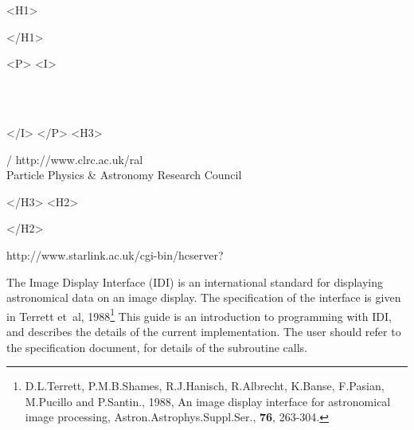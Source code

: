 \begin{htmlonly}
   \xlabel{}
   \begin{rawhtml} <H1> \end{rawhtml}
      \stardoctitle
   \begin{rawhtml} </H1> \end{rawhtml}


   \begin{rawhtml} <P> <I> \end{rawhtml}
   \stardoccategory\ \stardocnumber \\
   \stardocauthors \\
   \stardocdate
   \begin{rawhtml} </I> </P> <H3> \end{rawhtml}
       /
                        {http://www.clrc.ac.uk/ral} \\
      Particle Physics \& Astronomy Research Council \\
   \begin{rawhtml} </H3> <H2> \end{rawhtml}
   \begin{rawhtml} </H2> \end{rawhtml}
      {http://www.starlink.ac.uk/cgi-bin/hcserver?\stardocsource}\\


\end{htmlonly}


The Image Display Interface (IDI) is an international standard for
displaying astronomical data on an image display.
The specification of the interface is given in Terrett et~al,
1988\footnote{D.L.Terrett, P.M.B.Shames, R.J.Hanisch, R.Albrecht,
K.Banse, F.Pasian, M.Pucillo and P.Santin., 1988,
An image display interface for astronomical image processing,
Astron.Astrophys.Suppl.Ser., {\bf 76}, 263-304.}
This guide is an introduction to
programming with IDI, and describes the details of the current implementation.
The user should refer to the specification document, for details of the
subroutine calls.

